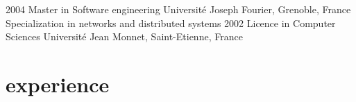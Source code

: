 \documentclass[]{k-cv} %
\begin{document}
\begin{entrylist}
\entry
{2004}
{Master {\normalfont in Software engineering}}
{Universit\'{e} Joseph Fourier, Grenoble, France}
{Specialization in networks and distributed systems}
\entry
{2002}
{Licence {\normalfont in Computer Sciences}}
{Universit\'{e} Jean Monnet, Saint-Etienne, France}
{}
\end{entrylist}

\section{experience}
\end{document}
